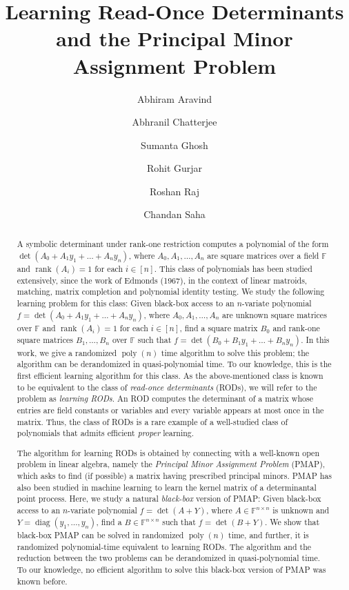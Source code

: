 \documentclass[11pt,letterpaper]{article}
\title{Learning Read-Once Determinants and the Principal Minor Assignment Problem}
\author[1]{Abhiram Aravind}
\author[2]{Abhranil Chatterjee}
\author[3]{Sumanta Ghosh}
\author[4]{Rohit Gurjar}
\author[5]{Roshan Raj}
\author[1]{Chandan Saha}
\affil[1]{Indian Institute of Science, Bangalore}
\affil[2]{Indian Institute of Technology Kanpur}
\affil[3]{Indian Statistical Institute, Kolkata}
\affil[4]{Indian Institute of Technology Bombay}
\affil[5]{Tata Institute of Fundamental Research, Mumbai}
\date{}
\DeclareMathOperator*{\diag}{diag}
\DeclareMathOperator*{\rank}{rank}
\newcommand{\F}{\mathbb{F}}
\DeclareMathOperator*{\pol}{poly}
\begin{document}
\maketitle

\begin{abstract}
A symbolic determinant under rank-one restriction computes a polynomial of the form $\det(A_0 + A_1y_1 + \ldots + A_ny_n)$, where $A_0, A_1, \ldots, A_n$ are square matrices over a field $\F$ and $\rank(A_i) = 1$ for each $i \in [n]$. This class of polynomials has been studied extensively, since the work of Edmonds (1967), in the context of linear matroids, matching, matrix completion and polynomial identity testing. We study the following learning problem for this class: Given black-box access to an $n$-variate polynomial $f = \det(A_0 + A_1y_1 + \ldots + A_ny_n)$, where $A_0, A_1, \ldots, A_n$ are unknown square matrices over $\F$ and $\rank(A_i) = 1$ for each $i \in [n]$, find a square matrix $B_0$ and rank-one square matrices $B_1, \ldots, B_n$ over $\F$ such that $f = \det(B_0 + B_1y_1 + \ldots + B_ny_n)$. In this work, we give a randomized $\pol(n)$ time algorithm to solve this problem; the algorithm can be derandomized in quasi-polynomial time. To our knowledge, this is the first efficient learning algorithm for this class. As the above-mentioned class is known to be equivalent to the class of \emph{read-once determinants} (RODs), we will refer to the problem as \emph{learning RODs}. An ROD computes the determinant of a matrix whose entries are field constants or variables and every variable appears at most once in the matrix. Thus, the class of RODs is a rare example of a well-studied class of polynomials that admits efficient \emph{proper} learning. 

The algorithm for learning RODs is obtained by connecting with a well-known open problem in linear algebra, namely the \emph{Principal Minor Assignment Problem} (PMAP), which asks to find (if possible) a matrix having prescribed principal minors. PMAP has also been studied in machine learning to learn the kernel matrix of a determinantal point process. Here, we study a natural \emph{black-box} version of PMAP: Given black-box access to an $n$-variate polynomial $f = \det(A + Y)$, where $A \in \F^{n \times n}$ is unknown and $Y = \diag(y_1, \ldots, y_n)$, find a $B \in \F^{n\times n}$ such that $f = \det(B + Y)$. We show that black-box PMAP can be solved in randomized $\pol(n)$ time, and further, it is randomized polynomial-time equivalent to learning RODs. The algorithm and the reduction between the two problems can be derandomized in quasi-polynomial time. To our knowledge, no efficient algorithm to solve this black-box version of PMAP was known before.


\end{abstract}
\end{document}
